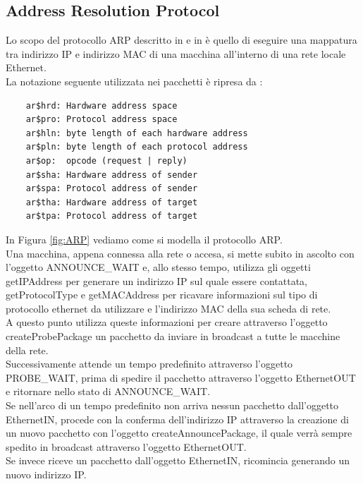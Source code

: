 \newpage
\subsection{Address Resolution Protocol}
Lo scopo del protocollo ARP descritto in \cite{RFC0826} e in \cite{RFC5227} è quello di eseguire una mappatura tra indirizzo IP e indirizzo MAC di una macchina all'interno di una rete locale Ethernet.\\
La notazione seguente utilizzata nei pacchetti è ripresa da \cite{RFC0826}:
\begin{lstlisting}
    ar$hrd: Hardware address space 
    ar$pro: Protocol address space
    ar$hln: byte length of each hardware address
    ar$pln: byte length of each protocol address
    ar$op:  opcode (request | reply)
    ar$sha: Hardware address of sender 
    ar$spa: Protocol address of sender 
    ar$tha: Hardware address of target
    ar$tpa: Protocol address of target
\end{lstlisting}
In Figura \ref{fig:ARP} vediamo come si modella il protocollo ARP.\\
Una macchina, appena connessa alla rete o accesa, si mette subito in ascolto con l'oggetto ANNOUNCE\_WAIT e, allo stesso tempo, utilizza gli oggetti getIPAddress per generare un indirizzo IP sul quale essere contattata, getProtocolType e getMACAddress  per ricavare informazioni sul tipo di protocollo ethernet da utilizzare e l'indirizzo MAC della sua scheda di rete.\\
A questo punto utilizza queste informazioni per creare attraverso l'oggetto createProbePackage un pacchetto da inviare in broadcast a tutte le macchine della rete.\\
Successivamente attende un tempo predefinito attraverso l'oggetto PROBE\_WAIT, prima di spedire il pacchetto attraverso l'oggetto EthernetOUT e ritornare nello stato di ANNOUNCE\_WAIT.\\
Se nell'arco di un tempo predefinito non arriva nessun pacchetto dall'oggetto EthernetIN, procede con la conferma dell'indirizzo IP attraverso la creazione di un nuovo pacchetto con l'oggetto createAnnouncePackage, il quale verrà sempre spedito in broadcast attraverso l'oggetto EthernetOUT.\\
Se invece riceve un pacchetto dall'oggetto EthernetIN, ricomincia generando un nuovo indirizzo IP.\\
